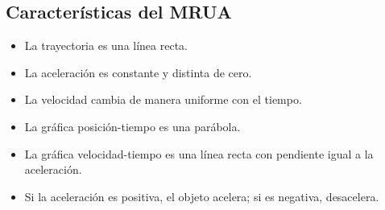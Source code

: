 \subsection{Características del MRUA}

\begin{itemize}
    \setlength{\itemsep}{0pt}
    \item La trayectoria es una línea recta.
    \item La aceleración es constante y distinta de cero.
    \item La velocidad cambia de manera uniforme con el tiempo.
    \item La gráfica posición-tiempo es una parábola.
    \item La gráfica velocidad-tiempo es una línea recta con pendiente igual a la aceleración.
    \item Si la aceleración es positiva, el objeto acelera; si es negativa, desacelera.
\end{itemize}